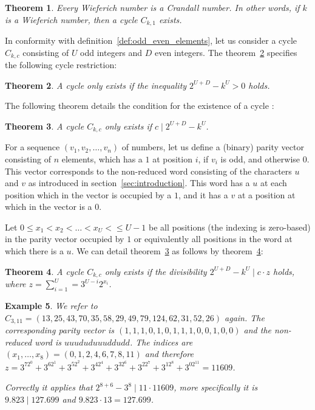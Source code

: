 \documentclass[12pt]{amsart}
\newtheorem{theorem}{Theorem}[section]
\newtheorem{example}[theorem]{Example}
\theoremstyle{definition}
\begin{document}
\begin{theorem}
\label{theo:crandall_wieferich}
Every Wieferich number is a Crandall number. In other words, if $k$ is a Wieferich number, then a cycle $C_{k,1}$ exists.
\end{theorem}

In conformity with definition~\ref{def:odd_even_elements}, let us consider a cycle $C_{k,c}$ consisting of $U$ odd integers and $D$ even integers. The theorem~\ref{theo:cycle_restriction_1} specifies the following cycle restriction:

\begin{theorem}
\label{theo:cycle_restriction_1}
A cycle only exists if the inequality $2^{U+D}-k^U>0$ holds.
\end{theorem}

The following theorem details the condition for the existence of a cycle \cite{Ref_Cox_2012}:

\begin{theorem}
\label{theo:cycle_restriction_2}
A cycle $C_{k,c}$ only exists if $c\mid2^{U+D}-k^U$.
\end{theorem}

For a sequence $(v_1,v_2,\ldots,v_n)$ of numbers, let us define a (binary) parity vector consisting of $n$ elements, which has a $1$ at position $i$, if $v_i$ is odd, and otherwise $0$. This vector corresponds to the non-reduced word consisting of the characters $u$ and $v$ as introduced in section~\ref{sec:introduction}. This word has a $u$ at each position which in the vector is occupied by a $1$, and it has a $v$ at a position at which in the vector is a $0$.

Let $0\le x_1<x_2<\ldots<x_{U}<\le U-1$ be all positions (the indexing is zero-based) in the parity vector occupied by $1$ or equivalently all positions in the word at which there is a $u$. We can detail theorem~\ref{theo:cycle_restriction_2} as follows by theorem~\ref{theo:cycle_restriction_3}:

\begin{theorem}
\label{theo:cycle_restriction_3}
A cycle $C_{k,c}$ only exists if the divisibility $2^{U+D}-k^U\mid c\cdot z$ holds, where $z=\sum_{i=1}^{U}=3^{U-i}2^{x_i}$.
\end{theorem}

\begin{example}
We refer to $C_{3,11}=(13,25,43,70,35,58,29,49,79,124,62,31,52,26)$ again. The corresponding parity vector is $(1,1,1,0,1,0,1,1,1,0,0,1,0,0)$ and the non-reduced word is $uuududuuuddudd$. The indices are $(x_1,\ldots,x_8)=(0,1,2,4,6,7,8,11)$ and therefore $z=3^72^0+3^62^1+3^52^2+3^42^4+3^32^6+3^22^7+3^12^8+3^02^{11}=11609$.

\par\medskip\noindent
Correctly it applies that $2^{8+6}-3^8\mid11\cdot11609$, more specifically it is $9.823\mid127.699$ and $9.823\cdot13=127.699$. 
\end{example}
\end{document}
